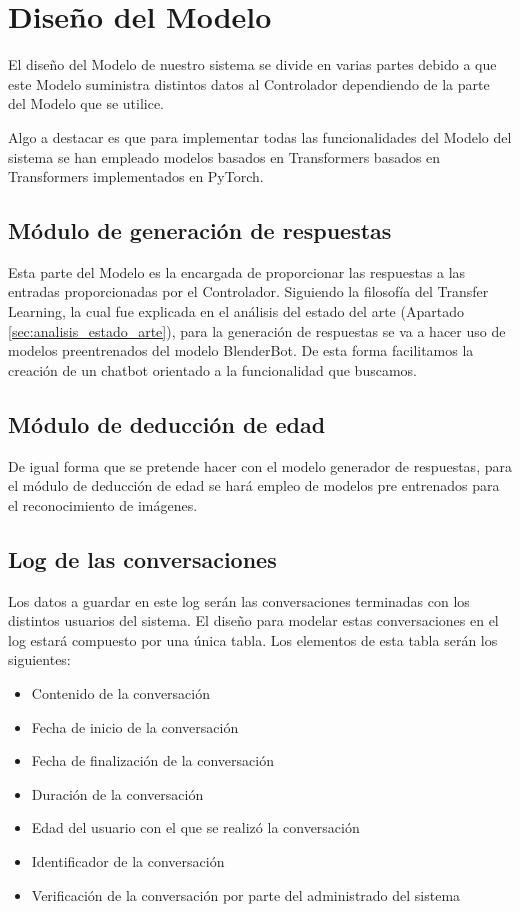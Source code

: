 \section{Diseño del Modelo}

El diseño del Modelo de nuestro sistema se divide en varias partes debido a que este Modelo suministra distintos datos al Controlador dependiendo de la parte del Modelo que se utilice.

Algo a destacar es que para implementar todas las funcionalidades del Modelo del sistema se han empleado modelos basados en Transformers basados en Transformers implementados en PyTorch.

\subsection*{Módulo de generación de respuestas}

Esta parte del Modelo es la encargada de proporcionar las respuestas a las entradas proporcionadas por el Controlador. Siguiendo la filosofía del Transfer Learning, la cual fue explicada en el análisis del estado del arte (Apartado \ref{sec:analisis_estado_arte}), para la generación de respuestas se va a hacer uso de modelos preentrenados del modelo BlenderBot. De esta forma facilitamos la creación de un chatbot orientado a la funcionalidad que buscamos.

\subsection*{Módulo de deducción de edad}

De igual forma que se pretende hacer con el modelo generador de respuestas, para el módulo de deducción de edad se hará empleo de modelos pre entrenados para el reconocimiento de imágenes.

\subsection*{Log de las conversaciones}

Los datos a guardar en este log serán las conversaciones terminadas con los distintos usuarios del sistema. El diseño para modelar estas conversaciones en el log estará compuesto por una única tabla. Los elementos de esta tabla serán los siguientes:

\begin{itemize}
\item Contenido de la conversación
\item Fecha de inicio de la conversación
\item Fecha de finalización de la conversación
\item Duración de la conversación
\item Edad del usuario con el que se realizó la conversación
\item Identificador de la conversación
\item Verificación de la conversación por parte del administrado del sistema
\end{itemize}

